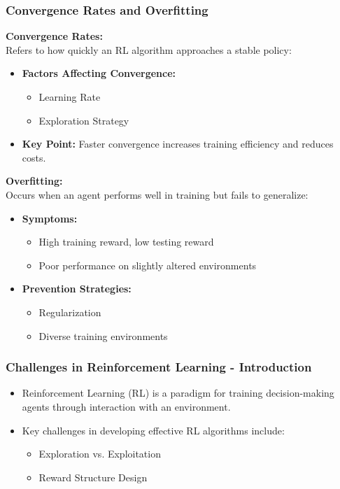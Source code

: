 \documentclass[aspectratio=169]{beamer}
\begin{document}
\begin{frame}[fragile]
    \frametitle{Convergence Rates and Overfitting}
    
    \textbf{Convergence Rates:} \\
    Refers to how quickly an RL algorithm approaches a stable policy:
    \begin{itemize}
        \item \textbf{Factors Affecting Convergence:}
        \begin{itemize}
            \item Learning Rate
            \item Exploration Strategy
        \end{itemize}
        \item \textbf{Key Point:} Faster convergence increases training efficiency and reduces costs.
    \end{itemize}
    
    \textbf{Overfitting:} \\
    Occurs when an agent performs well in training but fails to generalize:
    \begin{itemize}
        \item \textbf{Symptoms:} 
        \begin{itemize}
            \item High training reward, low testing reward
            \item Poor performance on slightly altered environments
        \end{itemize}
        \item \textbf{Prevention Strategies:}
        \begin{itemize}
            \item Regularization
            \item Diverse training environments
        \end{itemize}
    \end{itemize}
\end{frame}

\begin{frame}[fragile]
    \frametitle{Challenges in Reinforcement Learning - Introduction}
    \begin{itemize}
        \item Reinforcement Learning (RL) is a paradigm for training decision-making agents through interaction with an environment.
        \item Key challenges in developing effective RL algorithms include:
        \begin{itemize}
            \item Exploration vs. Exploitation
            \item Reward Structure Design
        \end{itemize}
    \end{itemize}
\end{frame}
\end{document}
